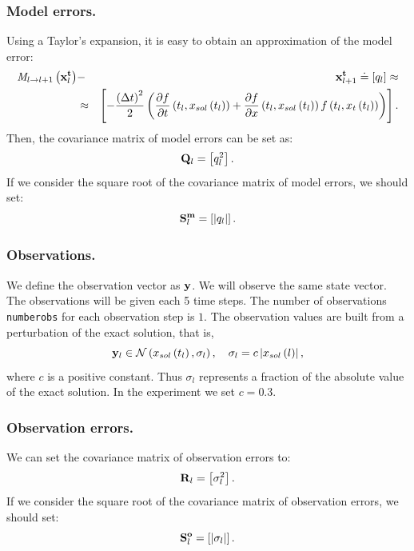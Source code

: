 \documentclass[12pt]{article}
\begin{document}
\subsubsection{Model errors.}
Using a Taylor's expansion, it is easy to obtain an approximation of the model error:
\begin{eqnarray}
{\it M}_{l \rightarrow l+1} \left( {\bf x}_l^{\bf t} \right) & - & {\bf x}_{l+1}^{\bf t} \doteq \left[ q_l \right] \approx \nonumber
\\
& \approx & \left[ - \frac{ \left( \Delta t \right)^2}{2} \left( \frac{\partial f}{\partial t}\left( t_l , x_{sol} \left( t_l \right) \right) + \frac{\partial f}{\partial x} \left( t_l , x_{sol} \left( t_l \right) \right) f \left( t_l , x_t \left( t_l \right) \right) \right) \right].
\end{eqnarray}
Then, the covariance matrix of model errors can be set as:
\begin{equation}
{\bf Q}_l = \left[ q_l^2 \right].
\end{equation}
If we consider the square root of the covariance matrix of model errors, we should set:
\begin{equation}
{\bf S}_l^{\bf m} = \left[ \left| q_l \right| \right].
\end{equation}

\subsubsection{Observations.}
We define the observation vector as ${\bf y}$. We will observe the same state vector. The observations will be given each 5 time steps. The number of observations {\tt numberobs} for each observation step is $1$. The observation values are built from a perturbation of the exact solution, that is,
\begin{equation}
{\bf y}_l \in \mathcal{N} \left( x_{sol} \left( t_l \right), \sigma_l \right), \quad \sigma_l = c \left| x_{sol}\left( l \right) \right|,
\end{equation}
where $c$ is a positive constant. Thus $\sigma_l$ represents a fraction of the absolute value of the exact solution. In the experiment we set $c = 0.3$.

\subsubsection{Observation errors.}
We can set the covariance matrix of observation errors to:
\begin{equation}
{\bf R}_l = \left[ \sigma_l^2 \right].
\end{equation}
If we consider the square root of the covariance matrix of observation errors, we should set:
\begin{equation}
{\bf S}_l^{\bf o} = \left[ \left| \sigma_l \right| \right].
\end{equation}
\end{document}
